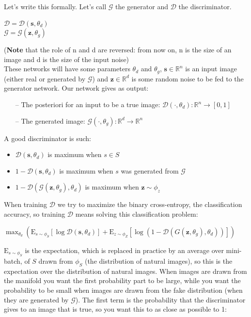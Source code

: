 Let's write this formally. Let's call $\mathcal{G}$ the generator and $\mathcal{D}$ the discriminator.
\begin{center}
    $\mathcal{D}=\mathcal{D}\left(\boldsymbol{s}, \theta_{d}\right)$ \\
    $\mathcal{G}=\mathcal{G}\left(\mathbf{z}, \theta_{g}\right)$
\end{center}
(\textbf{Note} that the role of n and d are reversed: from now on, n is the size of an image and d is the size of the input noise)\\
 These networks will have some parameters $\theta_{d}$ and $ \theta_{g}$, $\boldsymbol{s}\in \mathbb{R}^{n}$ is an input image (either real or generated by $\mathcal{G}$) and $\boldsymbol{z}\in \mathbb{R}^{d}$ is some random noise to be fed to the generator network. 
 Our network gives as output:
\begin{itemize}
    \item[--] The posteriori for an input to be a true image: $
\mathcal{D}\left(\cdot, \theta_{d}\right): \mathbb{R}^{n} \rightarrow[0,1]
$
    \item[--] The generated image: $
\mathcal{G}\left(\cdot, \theta_{g}\right): \mathbb{R}^{d} \rightarrow  \mathbb{R}^{n}
$
\end{itemize}{}
A good discriminator is such: 
\begin{itemize}
    \item $\mathcal{D}\left(\boldsymbol{s}, \theta_{d}\right)$ is maximum when $s \in S$
    \item $ 1 - \mathcal{D}\left(\boldsymbol{s}, \theta_{d}\right)$ is maximum when $s$ was generated from $\mathcal{G}$
    \item $ 1 - \mathcal{D}\left(\mathcal{G}\left(\boldsymbol{z}, \theta_{g}\right), \theta_{d}\right)$ is maximum when $\boldsymbol{z} \sim \phi_z $
\end{itemize}{}
 When training $\mathcal{D}$ we try to maximize the binary cross-entropy, the classification accuracy, so training $\mathcal{D}$ means solving this classification problem:
 \begin{center}
     $\max _{\theta_{d}}\left(\mathrm{E}_{s \sim \phi_{S}}\left[\log \mathcal{D}\left(\boldsymbol{s}, \theta_{d}\right)\right]+\mathrm{E}_{z \sim \phi_{Z}}\left[\log \left(1-\mathcal{D}\left(G\left(\mathbf{z}, \theta_{g}\right), \theta_{d}\right)\right)\right]\right)$
 \end{center}
$\mathrm{E}_{s \sim \phi_{S}}$ is the expectation, which is replaced in practice by an average over mini-batch, of $S$ drawn from $\phi_{S}$ (the distribution of natural images),  so this is the expectation over the distribution of natural images. When images are drawn from the manifold you want the first probability part to be large, while you want the probability to be small when images are drawn from the fake distribution (when they are generated by $\mathcal{G}$). The first term is the probability that the discriminator gives to an image that is true, so you want this to as close as possible to 1:
